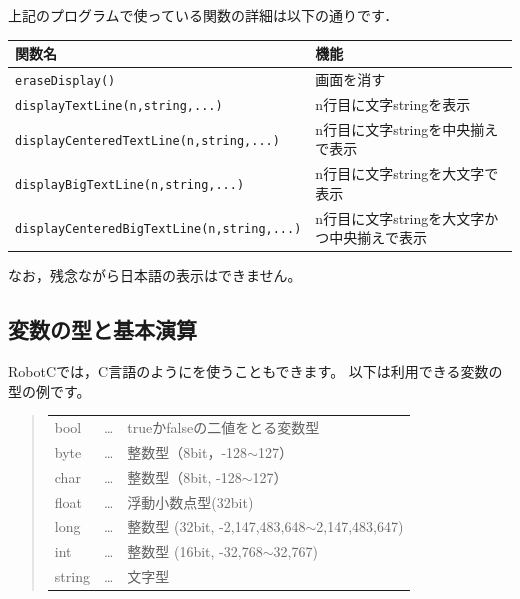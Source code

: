 \documentclass[11pt]{jsarticle}
\makeatletter
\newcounter{wnum}[section]
\def\thewnum{課題\thesection.\the\c@wnum}
\def\work{\refstepcounter{wnum}%
  \vspace{3mm}\noindent\textbf{[\thewnum]}~}
\def\nmindex{\@ifnextchar[{\@nmindex}{\@@nmindex}}
\def\@nmindex[#1]#2{#2\index{#1@#2}}
\def\@@nmindex#1{#1\index{#1}}
\makeatother
\begin{document}
上記のプログラムで使っている関数の詳細は以下の通りです．
\begin{center}
\begin{tabular}[t]{l|l}\hline
関数名 & 機能 \\\hline
\verb|eraseDisplay()| & 画面を消す\\
\verb|displayTextLine(n,string,...)| & n行目に文字stringを表示\\
\verb|displayCenteredTextLine(n,string,...)| & n行目に文字stringを中央揃えで表示\\
\verb|displayBigTextLine(n,string,...)| & n行目に文字stringを大文字で表示\\
\verb|displayCenteredBigTextLine(n,string,...)| & n行目に文字stringを大文字かつ中央揃えで表示\\\hline
\end{tabular}
\end{center}
なお，残念ながら日本語の表示はできません。



\subsection{変数の型と基本演算}
RobotCでは，C言語のように\nmindex[へんすう]{変数}を使うこともできます。
以下は利用できる変数の型の例です。

\begin{quote}
  \begin{tabular}{lcr}
    \multicolumn{1}{l}{bool} & \dots 
    & \multicolumn{1}{l}{trueかfalseの二値をとる変数型} \\
    \multicolumn{1}{l}{byte} & \dots 
    & \multicolumn{1}{l}{整数型（8bit，-128$\sim$127）} \\
    \multicolumn{1}{l}{char} & \dots
    & \multicolumn{1}{l}{整数型（8bit, -128$\sim$127）} \\
    \multicolumn{1}{l}{float} & \dots
    &  \multicolumn{1}{l}{浮動小数点型(32bit)} \\
    \multicolumn{1}{l}{long} & \dots
    &  \multicolumn{1}{l}{整数型 (32bit, -2,147,483,648$\sim$2,147,483,647)} \\
    \multicolumn{1}{l}{int} & \dots
    & \multicolumn{1}{l}{整数型 (16bit, -32,768$\sim$32,767)} \\
    \multicolumn{1}{l}{string} & \dots
    & \multicolumn{1}{l}{文字型} \\
\end{tabular}
\end{quote}
\end{document}
